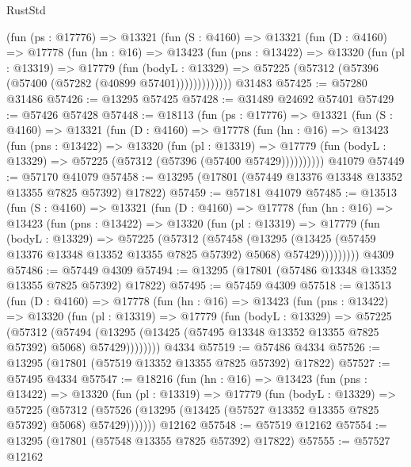 \begin{lexlean}{RustStd}
\begin{coremodule}
      (fun (ps : @17776) =>
      @13321
        (fun (S : @4160) =>
        @13321
          (fun (D : @4160) =>
          @17778
            (fun (hn : @16) =>
            @13423
              (fun (pns : @13422) =>
              @13320
                (fun (pl : @13319) =>
                @17779
                  (fun (bodyL : @13329) =>
                  @57225 (@57312 (@57396 (@57400 (@57282 (@40899 @57401)))))))))))))
    @31483
@57425 := @57280 @31486
@57426 := @13295 @57425
@57428 := @31489 @24692 @57401
@57429 := @57426 @57428
@57448 := @18113
    (fun (ps : @17776) =>
    @13321
      (fun (S : @4160) =>
      @13321
        (fun (D : @4160) =>
        @17778
          (fun (hn : @16) =>
          @13423
            (fun (pns : @13422) =>
            @13320
              (fun (pl : @13319) =>
              @17779 (fun (bodyL : @13329) => @57225 (@57312 (@57396 (@57400 @57429))))))))))
    @41079
@57449 := @57170 @41079
@57458 := @13295 (@17801 (@57449 @13376 @13348 @13352 @13355 @7825 @57392) @17822)
@57459 := @57181 @41079
@57485 := @13513
    (fun (S : @4160) =>
    @13321
      (fun (D : @4160) =>
      @17778
        (fun (hn : @16) =>
        @13423
          (fun (pns : @13422) =>
          @13320
            (fun (pl : @13319) =>
            @17779
              (fun (bodyL : @13329) =>
              @57225
                (@57312
                  (@57458
                    (@13295
                      (@13425 (@57459 @13376 @13348 @13352 @13355 @7825 @57392) @5068)
                      @57429)))))))))
    @4309
@57486 := @57449 @4309
@57494 := @13295 (@17801 (@57486 @13348 @13352 @13355 @7825 @57392) @17822)
@57495 := @57459 @4309
@57518 := @13513
    (fun (D : @4160) =>
    @17778
      (fun (hn : @16) =>
      @13423
        (fun (pns : @13422) =>
        @13320
          (fun (pl : @13319) =>
          @17779
            (fun (bodyL : @13329) =>
            @57225
              (@57312
                (@57494
                  (@13295 (@13425 (@57495 @13348 @13352 @13355 @7825 @57392) @5068) @57429))))))))
    @4334
@57519 := @57486 @4334
@57526 := @13295 (@17801 (@57519 @13352 @13355 @7825 @57392) @17822)
@57527 := @57495 @4334
@57547 := @18216
    (fun (hn : @16) =>
    @13423
      (fun (pns : @13422) =>
      @13320
        (fun (pl : @13319) =>
        @17779
          (fun (bodyL : @13329) =>
          @57225
            (@57312 (@57526 (@13295 (@13425 (@57527 @13352 @13355 @7825 @57392) @5068) @57429)))))))
    @12162
@57548 := @57519 @12162
@57554 := @13295 (@17801 (@57548 @13355 @7825 @57392) @17822)
@57555 := @57527 @12162

\end{coremodule}
\end{lexlean}
